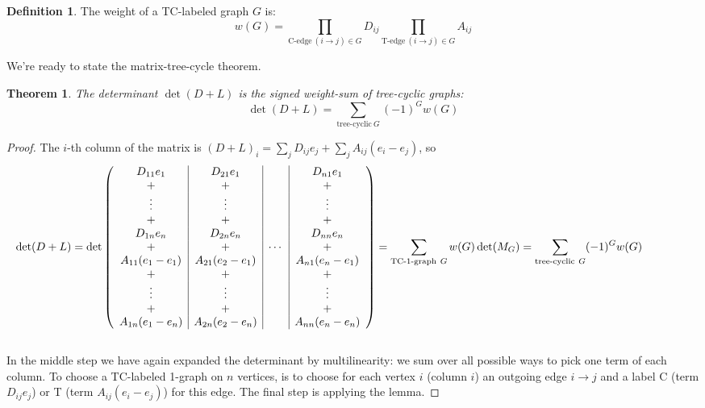 \documentclass[a4paper, 11pt]{article}
\newtheorem{theorem}{Theorem}[section]
\theoremstyle{definition}
\newtheorem{definition}{Definition}[section]
\begin{document}
\begin{definition}
  The weight of a TC-labeled graph $G$ is:
  \[
    w(G) = \prod_{\text{C-edge}\ (i \to j) \in G} D_{ij} \prod_{\text{T-edge}\ (i \to j) \in G} A_{ij}
  \]
\end{definition}

We’re ready to state the matrix-tree-cycle theorem.

\begin{theorem} The determinant $\det(D+L)$ is the signed weight-sum of tree-cyclic graphs:
  \[
    \det(D + L) = \sum_{\text{tree-cyclic}\ G} (-1)^G w(G)
  \]
\end{theorem}
\begin{proof}
  The $i$-th column of the matrix is $(D + L)_i = \sum_j D_{ij} e_j + \sum_j A_{ij}(e_i - e_j)$, so \\
  \begin{align*}
    \hspace*{-1.5cm}
    \det(D + L) = \det \left(
    \begin{array}{c|c|c|c}
      D_{11} e_1         & D_{21} e_1         &        & D_{n1} e_1          \\
      +                  & +                  &        & +                   \\
      \vdots             & \vdots             &        & \vdots              \\
      +                  & +                  &        & +                   \\
      D_{1n} e_n         & D_{2n} e_n         &        & D_{nn} e_n          \\
      +                  & +                  & \cdots & +                   \\
      A_{11} (e_1 - e_1) & A_{21} (e_2 - e_1) &        & A_{n1} (e_n - e_1)  \\
      +                  & +                  &        & +                   \\
      \vdots             & \vdots             &        & \vdots              \\
      +                  & +                  &        & +                   \\
      A_{1n} (e_1 - e_n) & A_{2n} (e_2 - e_n) &        & A_{nn} (e_n - e_n)
    \end{array} \right)
    = \sum_{\text{TC-1-graph}\ G} w(G) \det(M_G)
    = \sum_{\text{tree-cyclic}\ G} (-1)^G w(G)
  \end{align*} \\
  In the middle step we have again expanded the determinant by multilinearity: we sum over all possible ways to pick one term of each column. To choose a TC-labeled 1-graph on $n$ vertices, is to choose for each vertex $i$ (column $i$) an outgoing edge $i \to j$ and a label C (term $D_{ij} e_j$) or T (term $A_{ij}(e_i - e_j)$) for this edge. The final step is applying the lemma.
\end{proof}
\end{document}
